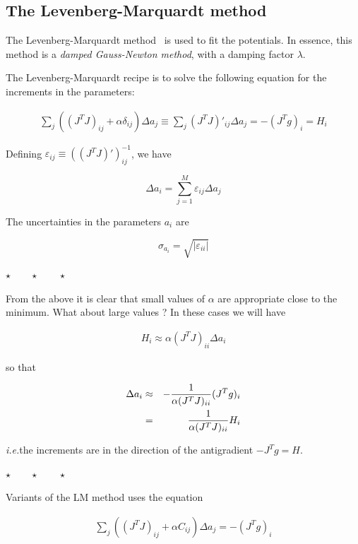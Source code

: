 \documentclass[a4paper,12pt,onecolumn]{article}
\makeatletter
\newcommand{\ie}{\emph{i.e.\@\xspace}}
\def\eps{\varepsilon}
\newcommand{\stars}{\begin{center} \vspace{0.5cm}$\star \qquad \star \qquad \star$\vspace{0.5cm}\end{center}}
\makeatother
\begin{document}
\subsection{The Levenberg-Marquardt method}

The Levenberg-Marquardt method~\cite{Bevington-2003}
is used to fit the potentials. In essence, this method is
a \textit{damped Gauss-Newton method}, with a damping factor $\lambda$.

The Levenberg-Marquardt recipe is to solve the following
equation for the increments in the parameters:

\begin{eqnarray}
\sum_j \left( (J^T J)_{ij} + \alpha \delta_{ij} \right) \Delta a_j
\equiv
\sum_j (J^T J)'_{ij} \Delta a_j
= - (J^T g)_i
= H_i
\label{eq:LM-eq}
\end{eqnarray}

Defining $\eps_{ij} \equiv ((J^T J)')^{-1}_{ij}$, we have

\begin{equation}
\Delta a_i = \sum_{j=1}^M \eps_{ij} \Delta a_j
\end{equation}

The uncertainties in the parameters $a_i$ are

\begin{equation}
\sigma_{a_i} = \sqrt{ |\eps_{ii}| }
\end{equation}

\stars

From the above it is clear that small values of $\alpha$
are appropriate close to the minimum. What about large values ?
In these cases we will have

\begin{eqnarray}
H_i \approx \alpha (J^T J)_{ii} \Delta a_i
\end{eqnarray}

so that

\begin{eqnarray}
\Delta a_i
&\approx &
- {1 \over \alpha (J^T J)_{ii}} (J^T g)_i \\
&=& {1 \over \alpha (J^T J)_{ii}} H_i
\end{eqnarray}

\ie the increments are in the direction of the antigradient
$- J^T g = H$.

\stars

Variants of the LM method uses the equation

\begin{eqnarray}
\sum_j \left( (J^T J)_{ij} + \alpha C_{ij} \right) \Delta a_j
= - (J^T g)_i
\end{eqnarray}
\end{document}
